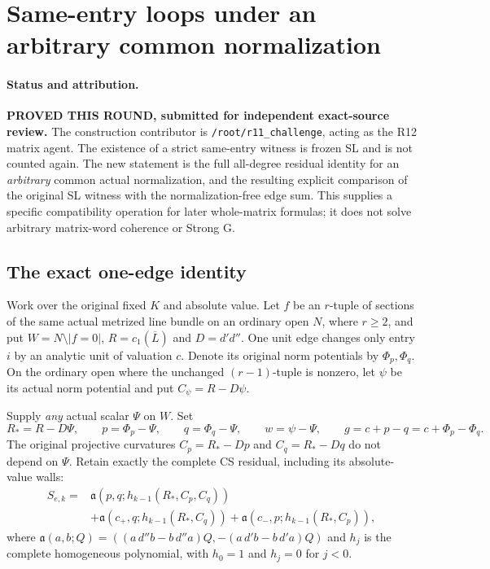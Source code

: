 \section{Same-entry loops under an arbitrary common normalization}
\label{sec:r12-same-entry-arbitrary-normalization}

\paragraph{Status and attribution.}
\textbf{PROVED THIS ROUND, submitted for independent exact-source review.}
The construction contributor is \texttt{/root/r11\_challenge}, acting
as the R12 matrix agent.  The existence of a strict same-entry witness
is frozen SL and is not counted again.  The new statement is the full
all-degree residual identity for an \emph{arbitrary} common actual
normalization, and the resulting explicit comparison of the original
SL witness with the normalization-free edge sum.  This supplies a
specific compatibility operation for later whole-matrix formulas; it
does not solve arbitrary matrix-word coherence or Strong G.

\subsection{The exact one-edge identity}

Work over the original fixed $K$ and absolute value.  Let $f$ be an
$r$-tuple of sections of the same actual metrized line bundle on an
ordinary open $N$, where $r\ge2$, and put $W=N\setminus|f=0|$,
$R=c_1(\overline L)$ and $D=d'd''$.  One unit edge changes only
entry $i$ by an analytic unit of valuation $c$.  Denote its original
norm potentials by $\Phi_p,\Phi_q$.  On the ordinary open where the
unchanged $(r-1)$-tuple is nonzero, let $\psi$ be its actual norm
potential and put $C_\psi=R-D\psi$.

Supply \emph{any} actual scalar $\Psi$ on $W$.  Set
\[
 R_*=R-D\Psi,\qquad p=\Phi_p-\Psi,\qquad
 q=\Phi_q-\Psi,\qquad w=\psi-\Psi,
 \qquad g=c+p-q=c+\Phi_p-\Phi_q.
 \tag{SAN1}
\]
The original projective curvatures $C_p=R_*-Dp$ and
$C_q=R_*-Dq$ do not depend on $\Psi$.  Retain exactly the complete
CS residual, including its absolute-value walls:
\[
\begin{split}
 S_{e,k}={}&\mathfrak a(p,q;h_{k-1}(R_*,C_p,C_q))\\
 &+\mathfrak a(c_+,q;h_{k-1}(R_*,C_q))
   +\mathfrak a(c_-,p;h_{k-1}(R_*,C_p)),
 \tag{SAN2}
\end{split}
\]
where $\mathfrak a(a,b;Q)=((a\,d''b-b\,d''a)Q,
-(a\,d'b-b\,d'a)Q)$ and $h_j$ is the complete homogeneous
polynomial, with $h_0=1$ and $h_j=0$ for $j<0$.

